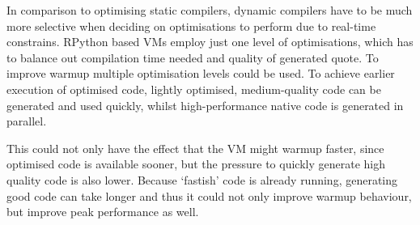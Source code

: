 In comparison to optimising static compilers, dynamic compilers have to be much
more selective when deciding on optimisations to perform due to real-time
constrains. RPython based VMs employ just one level of optimisations, which has
to balance out compilation time needed and quality of generated quote. To
improve warmup multiple optimisation levels could be used. To achieve earlier
execution of optimised code, lightly optimised, medium-quality code can be
generated and used quickly, whilst high-performance native code is generated in
parallel.

This could not only have the effect that the VM might warmup faster, since
optimised code is available sooner, but the pressure to quickly generate high
quality code is also lower. Because `fastish' code is already running,
generating good code can take longer and thus it could not only improve warmup
behaviour, but improve peak performance as well.


